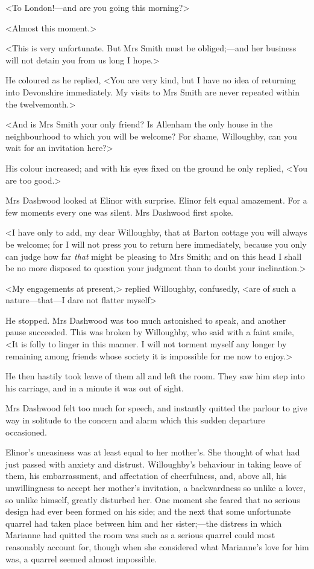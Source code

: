 <To London!—and are you going this morning?>

<Almost this moment.>

<This is very unfortunate. But Mrs Smith must be obliged;—and her business will not detain you from us long I hope.>

He coloured as he replied, <You are very kind, but I have no idea of returning into Devonshire immediately. My visits to Mrs Smith are never repeated within the twelvemonth.>

<And is Mrs Smith your only friend? Is Allenham the only house in the neighbourhood to which you will be welcome? For shame, Willoughby, can you wait for an invitation here?>

His colour increased; and with his eyes fixed on the ground he only replied, <You are too good.>

Mrs Dashwood looked at Elinor with surprise. Elinor felt equal amazement. For a few moments every one was silent. Mrs Dashwood first spoke.

<I have only to add, my dear Willoughby, that at Barton cottage you will always be welcome; for I will not press you to return here immediately, because you only can judge how far \textit{that} might be pleasing to Mrs Smith; and on this head I shall be no more disposed to question your judgment than to doubt your inclination.>

<My engagements at present,> replied Willoughby, confusedly, <are of such a nature—that—I dare not flatter myself\longdash>

He stopped. Mrs Dashwood was too much astonished to speak, and another pause succeeded. This was broken by Willoughby, who said with a faint smile, <It is folly to linger in this manner. I will not torment myself any longer by remaining among friends whose society it is impossible for me now to enjoy.>

He then hastily took leave of them all and left the room. They saw him step into his carriage, and in a minute it was out of sight.

Mrs Dashwood felt too much for speech, and instantly quitted the parlour to give way in solitude to the concern and alarm which this sudden departure occasioned.

Elinor's uneasiness was at least equal to her mother's. She thought of what had just passed with anxiety and distrust. Willoughby's behaviour in taking leave of them, his embarrassment, and affectation of cheerfulness, and, above all, his unwillingness to accept her mother's invitation, a backwardness so unlike a lover, so unlike himself, greatly disturbed her. One moment she feared that no serious design had ever been formed on his side; and the next that some unfortunate quarrel had taken place between him and her sister;—the distress in which Marianne had quitted the room was such as a serious quarrel could most reasonably account for, though when she considered what Marianne's love for him was, a quarrel seemed almost impossible.

